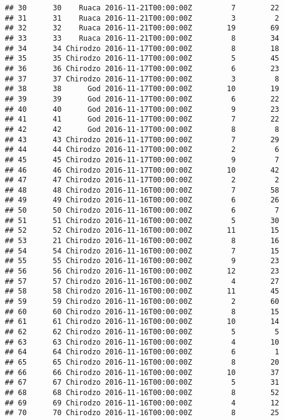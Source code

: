 \documentclass[
]{article}
\begin{document}
\begin{verbatim}
## 30      30    Ruaca 2016-11-21T00:00:00Z         7        22
## 31      31    Ruaca 2016-11-21T00:00:00Z         3         2
## 32      32    Ruaca 2016-11-21T00:00:00Z        19        69
## 33      33    Ruaca 2016-11-21T00:00:00Z         8        34
## 34      34 Chirodzo 2016-11-17T00:00:00Z         8        18
## 35      35 Chirodzo 2016-11-17T00:00:00Z         5        45
## 36      36 Chirodzo 2016-11-17T00:00:00Z         6        23
## 37      37 Chirodzo 2016-11-17T00:00:00Z         3         8
## 38      38      God 2016-11-17T00:00:00Z        10        19
## 39      39      God 2016-11-17T00:00:00Z         6        22
## 40      40      God 2016-11-17T00:00:00Z         9        23
## 41      41      God 2016-11-17T00:00:00Z         7        22
## 42      42      God 2016-11-17T00:00:00Z         8         8
## 43      43 Chirodzo 2016-11-17T00:00:00Z         7        29
## 44      44 Chirodzo 2016-11-17T00:00:00Z         2         6
## 45      45 Chirodzo 2016-11-17T00:00:00Z         9         7
## 46      46 Chirodzo 2016-11-17T00:00:00Z        10        42
## 47      47 Chirodzo 2016-11-17T00:00:00Z         2         2
## 48      48 Chirodzo 2016-11-16T00:00:00Z         7        58
## 49      49 Chirodzo 2016-11-16T00:00:00Z         6        26
## 50      50 Chirodzo 2016-11-16T00:00:00Z         6         7
## 51      51 Chirodzo 2016-11-16T00:00:00Z         5        30
## 52      52 Chirodzo 2016-11-16T00:00:00Z        11        15
## 53      21 Chirodzo 2016-11-16T00:00:00Z         8        16
## 54      54 Chirodzo 2016-11-16T00:00:00Z         7        15
## 55      55 Chirodzo 2016-11-16T00:00:00Z         9        23
## 56      56 Chirodzo 2016-11-16T00:00:00Z        12        23
## 57      57 Chirodzo 2016-11-16T00:00:00Z         4        27
## 58      58 Chirodzo 2016-11-16T00:00:00Z        11        45
## 59      59 Chirodzo 2016-11-16T00:00:00Z         2        60
## 60      60 Chirodzo 2016-11-16T00:00:00Z         8        15
## 61      61 Chirodzo 2016-11-16T00:00:00Z        10        14
## 62      62 Chirodzo 2016-11-16T00:00:00Z         5         5
## 63      63 Chirodzo 2016-11-16T00:00:00Z         4        10
## 64      64 Chirodzo 2016-11-16T00:00:00Z         6         1
## 65      65 Chirodzo 2016-11-16T00:00:00Z         8        20
## 66      66 Chirodzo 2016-11-16T00:00:00Z        10        37
## 67      67 Chirodzo 2016-11-16T00:00:00Z         5        31
## 68      68 Chirodzo 2016-11-16T00:00:00Z         8        52
## 69      69 Chirodzo 2016-11-16T00:00:00Z         4        12
## 70      70 Chirodzo 2016-11-16T00:00:00Z         8        25

\end{verbatim}
\end{document}
